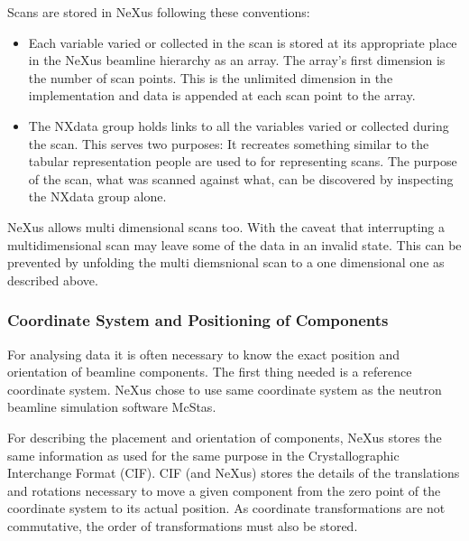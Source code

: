 \documentclass[%
 aip,
rsi,
 amsmath,amssymb,
 reprint,%
]{revtex4-1}
\begin{document}
Scans are stored in NeXus following these conventions: 
\begin{itemize}
\item Each variable varied or collected in the scan is stored at its appropriate place in the NeXus beamline 
 hierarchy as an array. The array's first dimension is the number of scan points. This is the unlimited dimension in 
 the implementation and data is appended at each scan point to the array. 
\item The NXdata group holds links to all the variables varied or collected during the scan. This serves two purposes: 
 It recreates something similar to the tabular representation people are used to for representing scans. The purpose 
 of the scan, what was scanned against what, can be discovered by inspecting the NXdata group alone. 
\end{itemize}

NeXus allows multi dimensional scans too. With the caveat that interrupting a multidimensional scan may leave some of 
the data in an invalid state. This can be prevented by unfolding the multi diemsnional scan to a one dimensional one 
as described  above.  

\subsubsection{Coordinate System and Positioning of Components}

For analysing data it is often necessary to know the exact position and orientation of beamline components. 
The first thing needed is a reference coordinate system. NeXus chose to use same coordinate system as the 
neutron beamline simulation software McStas\cite{mcstas}. 

For describing the placement and orientation of components, NeXus stores the same information as used for the 
same purpose in the Crystallographic Interchange Format (CIF)\cite{ITCVG}. CIF (and NeXus) stores the details 
of the translations and rotations necessary to move a given component from the zero point of the coordinate 
system to its actual position. As coordinate transformations are not commutative, the order of transformations 
must also be stored.
\end{document}
